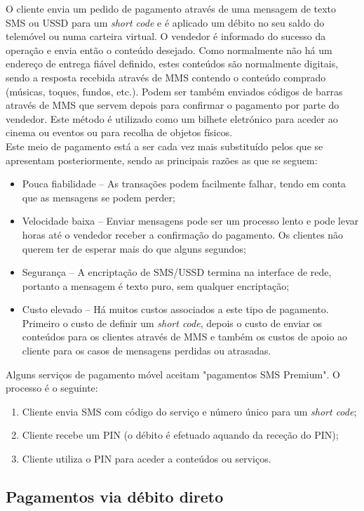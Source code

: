 O cliente envia um pedido de pagamento através de uma mensagem de texto SMS ou USSD para um \textit{short code} e é aplicado um débito no seu saldo do telemóvel ou numa carteira virtual. O vendedor é informado do sucesso da operação e envia então o conteúdo desejado.\cite{Blervaque2003} Como normalmente não há um endereço de entrega fiável definido, estes conteúdos são normalmente digitais, sendo a resposta recebida através de MMS contendo o conteúdo comprado (músicas, toques, fundos, etc.). Podem ser também enviados códigos de barras através de MMS que servem depois para confirmar o pagamento por parte do vendedor. Este método é utilizado como um bilhete eletrónico para aceder ao cinema ou eventos ou para recolha de objetos físicos.
\\Este meio de pagamento está a ser cada vez mais substituído pelos que se apresentam posteriormente, sendo as principais razões as que se seguem:
\begin{itemize}
\item Pouca fiabilidade – As transações podem facilmente falhar, tendo em conta que as mensagens se podem perder;
\item Velocidade baixa – Enviar mensagens pode ser um processo lento e pode levar horas até o vendedor receber a confirmação do pagamento. Os clientes não querem ter de esperar mais do que alguns segundos;
\item Segurança – A encriptação de SMS/USSD termina na interface de rede, portanto a mensagem é texto puro, sem qualquer encriptação;
\item Custo elevado – Há muitos custos associados a este tipo de pagamento. Primeiro o custo de definir um \textit{short code}, depois o custo de enviar os conteúdos para os clientes através de MMS e também os custos de apoio ao cliente para os casos de mensagens perdidas ou atrasadas.
\end{itemize} 
Alguns serviços de pagamento móvel aceitam "pagamentos SMS Premium"\cite{mobile}. O processo é o seguinte:
\begin{enumerate}
\item Cliente envia SMS com código do serviço e número único para um \textit{short code};
\item Cliente recebe um PIN (o débito é efetuado aquando da receção do PIN);
\item Cliente utiliza o PIN para aceder a conteúdos ou serviços.
\end{enumerate}

\subsection{Pagamentos via débito direto} \label{direto}


